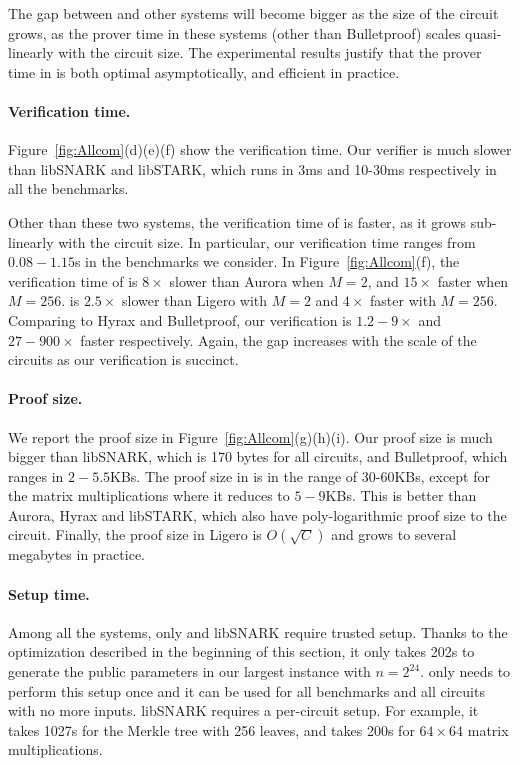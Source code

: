 The gap between \name and other systems will become bigger as the size of the circuit grows, as the prover time in these systems (other than Bulletproof) scales quasi-linearly with the circuit size. The experimental results justify that the prover time in \name is both optimal asymptotically, and efficient in practice.

\paragraph{Verification time.} Figure~\ref{fig:Allcom}(d)(e)(f) show the verification time. Our verifier is much slower than libSNARK and libSTARK, which runs in 3ms and 10-30ms respectively in all the benchmarks. 

Other than these two systems, the verification time of \name is faster, as it grows sub-linearly with the circuit size. In particular, our verification time ranges from $0.08-1.15$s in the benchmarks we consider. In Figure~\ref{fig:Allcom}(f), the verification time of \name is $8\times$ slower than Aurora when $M=2$, and $15\times$ faster when $M=256$. \name is $2.5\times$ slower than Ligero with $M=2$ and $4\times$ faster with $M=256$. Comparing to Hyrax and Bulletproof, our verification is $1.2-9\times$ and $27-900\times$ faster respectively. Again, the gap increases with the scale of the circuits as our verification is succinct.

\paragraph{Proof size.} We report the proof size in Figure~\ref{fig:Allcom}(g)(h)(i). Our proof size is much bigger than libSNARK, which is 170 bytes for all circuits, and Bulletproof, which ranges in $2-5.5$KBs. The proof size in \name is in the range of 30-60KBs, except for the matrix multiplications where it reduces to $5-9$KBs. This is better than Aurora, Hyrax and libSTARK, which also have poly-logarithmic proof size to the circuit. Finally, the proof size in Ligero is $O(\sqrt{C})$ and grows to several megabytes in practice.

\paragraph{Setup time.} Among all the systems, only \name and libSNARK require trusted setup. Thanks to the optimization described in the beginning of this section, it only takes 202s to generate the public parameters in our largest instance with $n = 2^24$. \name only needs to perform this setup once and it can be used for all benchmarks and all circuits with no more inputs. libSNARK requires a per-circuit setup. For example, it takes 1027s for the Merkle tree with 256 leaves, and takes 200s for $64\times 64$ matrix multiplications. 


